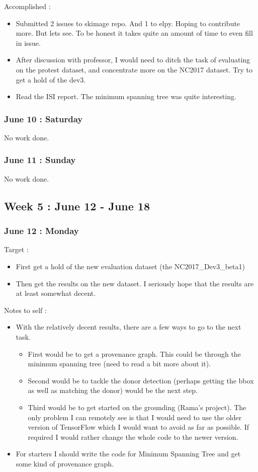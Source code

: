 \documentclass{article}
\begin{document}
Accomplished :
\begin{itemize}
\item Submitted 2 issues to skimage repo. And 1 to elpy. Hoping to contribute more. But lets see. To be honest it takes quite an amount of time to even fill in issue.
\item After discussion with professor, I would need to ditch the task of evaluating on the protest dataset, and concentrate more on the NC2017 dataset. Try to get a hold of the dev3.
\item Read the ISI report. The minimum spanning tree was quite interesting.
\end{itemize}

\subsubsection{June 10 : Saturday}
No work done.
\subsubsection{June 11 : Sunday}
No work done.

\subsection{Week 5 : June 12 - June 18}
\subsubsection{June 12 : Monday}
Target :
\begin{itemize}
\item First get a hold of the new evaluation dataset (the NC2017\_Dev3\_beta1)
\item Then get the results on the new dataset. I seriously hope that the results are at least somewhat decent.
\end{itemize}

Notes to self :
\begin{itemize}
\item With the relatively decent results, there are a few ways to go to the next task.
  \begin{itemize}
  \item First would be to get a provenance graph. This could be through the minimum spanning tree (need to read a bit more about it).
  \item Second would be to tackle the donor detection (perhaps getting the bbox as well as matching the donor) would be the next step.
  \item Third would be to get started on the grounding (Rama's project). The only problem I can remotely see is that I would need to use the older version of TensorFlow which I would want to avoid as far as possible. If required I would rather change the whole code to the newer version.
  \end{itemize}
\item For starters I should write the code for Minimum Spanning Tree and get some kind of provenance graph.
\end{itemize}
\end{document}
